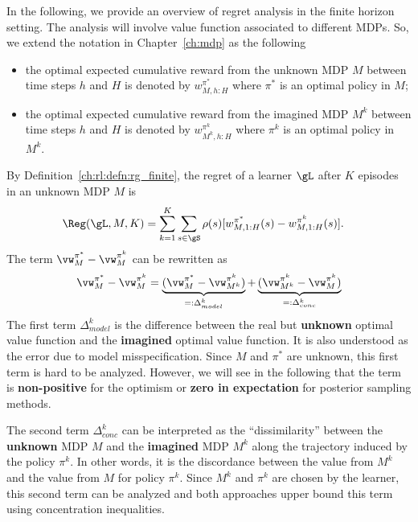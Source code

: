 In the following, we provide an overview of regret analysis in the finite horizon setting. 
The analysis will involve value function associated to different MDPs.
So, we extend the notation in Chapter~\ref{ch:mdp} as the following
\begin{itemize}
    \item the optimal expected cumulative reward from the unknown MDP $M$ between time steps $h$ and $H$ is denoted by $w^{\pi^*}_{M,h:H}$ where $\pi^*$ is an optimal policy in $M$;
    \item the optimal expected cumulative reward from the imagined MDP $M^k$ between time steps $h$ and $H$ is denoted by $w^{\pi^k}_{M^k,h:H}$ where $\pi^k$ is an optimal policy in $M^k$.
\end{itemize}

By Definition~\ref{ch:rl:defn:rg_finite}, the regret of a learner $\gL$ after $K$ episodes in an unknown MDP $M$ is
\begin{align*}
    \Reg(\gL, M, K) &= \sum_{k=1}^K\sum_{s\in\gS}\rho(s)[w^{\pi^*}_{M,1:H}(s) -w^{\pi^k}_{M,1:H}(s)].
\end{align*}
The term $\vw^{\pi^*}_M -\vw^{\pi^k}_M$ can be rewritten as
\begin{equation}
    \label{eq:rg_model_conc}
    \vw^{\pi^*}_M -\vw^{\pi^k}_M = \underbrace{(\vw^{\pi^*}_M -\vw^{\pi^k}_{M^k})}_{=:\Delta_{model}^k} +\underbrace{(\vw^{\pi^k}_{M^k} -\vw^{\pi^k}_M)}_{=:\Delta_{conc}^k}
\end{equation}
The first term $\Delta_{model}^k$ is the difference between the real but \textbf{unknown} optimal value function and the \textbf{imagined} optimal value function.
It is also understood as the error due to model misspecification.
Since $M$ and $\pi^*$ are unknown, this first term is hard to be analyzed.
However, we will see in the following that the term is \textbf{non-positive} for the optimism or \textbf{zero in expectation} for posterior sampling methods.

The second term $\Delta_{conc}^k$ can be interpreted as the ``dissimilarity'' between the \textbf{unknown} MDP $M$ and the \textbf{imagined} MDP $M^k$ along the trajectory induced by the policy $\pi^k$.
In other words, it is the discordance between the value from $M^k$ and the value from $M$ for policy $\pi^k$.
Since $M^k$ and $\pi^k$ are chosen by the learner, this second term can be analyzed and both approaches upper bound this term using concentration inequalities.

